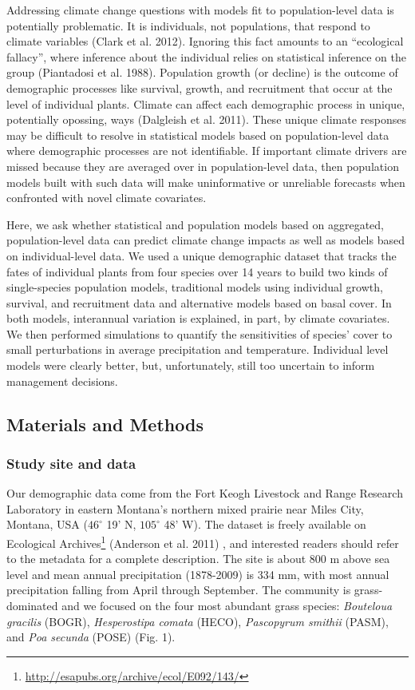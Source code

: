 \documentclass[12pt,]{article}
\begin{document}
Addressing climate change questions with models fit to population-level
data is potentially problematic. It is individuals, not populations,
that respond to climate variables (Clark et al. 2012). Ignoring this
fact amounts to an ``ecological fallacy'', where inference about the
individual relies on statistical inference on the group (Piantadosi et
al. 1988). Population growth (or decline) is the outcome of demographic
processes like survival, growth, and recruitment that occur at the level
of individual plants. Climate can affect each demographic process in
unique, potentially opossing, ways (Dalgleish et al. 2011). These unique
climate responses may be difficult to resolve in statistical models
based on population-level data where demographic processes are not
identifiable. If important climate drivers are missed because they are
averaged over in population-level data, then population models built
with such data will make uninformative or unreliable forecasts when
confronted with novel climate covariates.

Here, we ask whether statistical and population models based on
aggregated, population-level data can predict climate change impacts as
well as models based on individual-level data. We used a unique
demographic dataset that tracks the fates of individual plants from four
species over 14 years to build two kinds of single-species population
models, traditional models using individual growth, survival, and
recruitment data and alternative models based on basal cover. In both
models, interannual variation is explained, in part, by climate
covariates. We then performed simulations to quantify the sensitivities
of species' cover to small perturbations in average precipitation and
temperature. Individual level models were clearly better, but,
unfortunately, still too uncertain to inform management decisions.

\subsection{Materials and Methods}\label{materials-and-methods}

\subsubsection{Study site and data}\label{study-site-and-data}

Our demographic data come from the Fort Keogh Livestock and Range
Research Laboratory in eastern Montana's northern mixed prairie near
Miles City, Montana, USA ($46^{\circ}$ 19' N, $105^{\circ}$ 48' W). The
dataset is freely available on Ecological Archives\footnote{\url{http://esapubs.org/archive/ecol/E092/143/}}
(Anderson et al. 2011) , and interested readers should refer to the
metadata for a complete description. The site is about 800 m above sea
level and mean annual precipitation (1878-2009) is 334 mm, with most
annual precipitation falling from April through September. The community
is grass-dominated and we focused on the four most abundant grass
species: \emph{Bouteloua gracilis} (BOGR), \emph{Hesperostipa comata}
(HECO), \emph{Pascopyrum smithii} (PASM), and \emph{Poa secunda} (POSE)
(Fig. 1).
\end{document}
